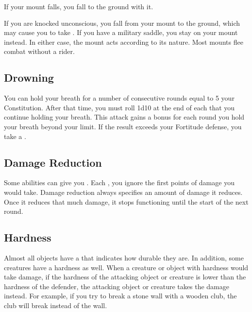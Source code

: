          If your mount falls, you fall to the ground with it.

         If you are knocked unconscious, you fall from your mount to the ground, which may cause you to take .
        If you have a military saddle, you stay on your mount instead.
        In either case, the mount acts according to its nature.
        Most mounts flee combat without a rider.

    \subsection{Drowning}\label{Drowning}
        You can hold your breath for a number of consecutive rounds equal to 5 \add your Constitution.
        After that time, you must roll 1d10 at the end of each  that you continue holding your breath.
        This attack gains a  bonus for each round you hold your breath beyond your limit.
        If the result exceeds your Fortitude defense, you take a .

    \subsection{Damage Reduction}\label{Damage Reduction}
        Some abilities can give you .
        Each , you ignore the first points of damage you would take.
        Damage reduction always specifies an amount of damage it reduces.
        Once it reduces that much damage, it stops functioning until the start of the next round.

    \subsection{Hardness}\label{Hardness}
        Almost all objects have a  that indicates how durable they are.
        In addition, some creatures have a hardness as well.
        When a creature or object with hardness would take damage, if the hardness of the attacking object or creature is lower than the hardness of the defender, the attacking object or creature takes the damage instead.
        For example, if you try to break a stone wall with a wooden club, the club will break instead of the wall.

